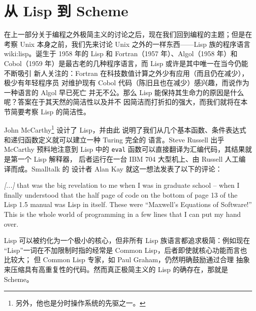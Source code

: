 \newpart
\section{从 Lisp 到 Scheme}\label{sec:lisp}

在上一部分关于编程之外极简主义的讨论之后，现在我们回到编程的主题；但是在考察
Unix 本身之前，我们先来讨论 Unix 之外的一样东西——Lisp 族的程序语言\cupercite%
{wiki:lisp}。诞生于 1958 年的 Lisp 和 Fortran（1957 年）、Algol（1958 年）和
Cobol（1959 年）是最古老的几种程序语言，而 Lisp 或许是其中唯一在当今仍能不断吸引
新人关注的：Fortran 在科技数值计算之外少有应用（而且仍在减少），极少有年轻程序员
对维护现有 Cobol 代码（陈旧且也在减少）感兴趣，而说作为一种语言的 Algol 早已死亡
并无不公。那么 Lisp 能保持其生命力的原因是什么呢？答案在于其天然的简洁性以及并不
因简洁而打折扣的强大，而我们就将在本节简要考察 Lisp 的简洁性。

John McCarthy\footnote{另外，他也是分时操作系统的先驱之一。} 设计了 Lisp，并由此
说明了我们从几个基本函数、条件表达式和递归函数定义就可以建立一种 Turing 完全的
语言。Steve Russell 出乎 McCarthy 预料地注意到 Lisp
中的 \verb|eval| 函数可以直接翻译为汇编代码，其结果就是第一个 Lisp 解释器，
后者运行在一台 IBM 704 大型机上、由 Russell 人工编译而成。Smalltalk 的
设计者 Alan Kay 就这一想法发表了以下的评论：
\begin{quoting}
	\emph{[...]} that was the big revelation to me when I was in graduate
	school -- when I finally understood that the half page of code on the
	bottom of page 13 of the Lisp 1.5 manual was Lisp
	in itself.  These were ``Maxwell's Equations of Software!''  This is the
	whole world of programming in a few lines that I can put my hand over.
\end{quoting}
Lisp 可以被约化为一个极小的核心，但非所有 Lisp 族语言都追求极简：例如现在
“Lisp”一词在不加限制时指的经常是 Common Lisp，后者即使就核心功能而言也比较大；
但 Common Lisp 专家，如 Paul Graham，仍然明确鼓励通过合理
抽象来压缩具有高重复性的代码。然而真正极简主义的 Lisp 的确存在，那就是 Scheme。

